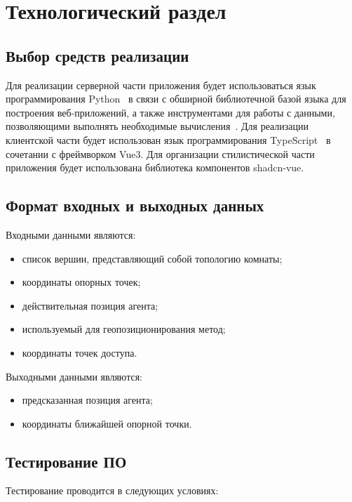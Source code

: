 \chapter{Технологический раздел}

\section{Выбор средств реализации}

Для реализации серверной части приложения будет использоваться язык программирования Python~\cite{python} в связи с обширной библиотечной базой языка для построения веб-приложений, а также инструментами для работы с данными, позволяющими выполнять необходимые вычисления~\cite{pyproblems}. Для реализации клиентской части будет использован язык программирования TypeScript~\cite{typescript} в сочетании с фреймворком Vue3. Для организации стилистической части приложения будет использована библиотека компонентов shadcn-vue.

\section{Формат входных и выходных данных}

Входными данными являются:

\begin{itemize}[label=---,left=0.49cm]
    \item список вершин, представляющий собой топологию комнаты;
    \item координаты опорных точек;
    \item действительная позиция агента;
    \item используемый для геопозиционирования метод;
    \item координаты точек доступа.
\end{itemize}

Выходными данными являются:

\begin{itemize}[label=---]
    \item предсказанная позиция агента;
    \item координаты ближайшей опорной точки.
\end{itemize}

\section{Тестирование ПО}

Тестирование проводится в следующих условиях:

